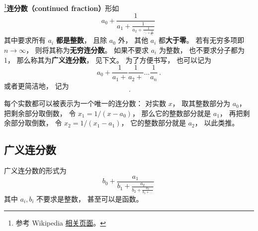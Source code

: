 
\footnote{参考 Wikipedia \href{https://en.wikipedia.org/wiki/Continued_fraction}{相关页面}。}\textbf{连分数（continued fraction）}形如
\begin{equation}
a_0 + \frac{1}{\displaystyle a_1 + \frac{1}{\displaystyle a_2 + \frac{1}{\displaystyle \ddots + \frac{1}{a_n}}}}~
\end{equation}
其中要求所有 $a_i$ \textbf{都是整数}， 且除 $a_0$ 外， 其他 $a_i$ 都\textbf{大于零}。 若有无穷多项即 $n\to\infty$， 则将其称为\textbf{无穷连分数}。 如果不要求 $a_i$ 为整数， 也不要求分子都为 1， 那么称其为\textbf{广义连分数}， 见下文。 为了方便书写， 也可以记为
\begin{equation}
a_0 + \frac{1}{a_1 + }\frac{1}{a_2 + }\dots \frac{1}{a_n}~.
\end{equation}
或者更简洁地， 记为
\begin{equation}
[a_0;\ a_1,\ a_2,\ \dots\ ,\ a_n]~.
\end{equation}

每个实数都可以被表示为一个唯一的连分数： 对实数 $x$， 取其整数部分为 $a_0$， 把剩余部分取倒数， 令 $x_1 = 1/(x-a_0)$， 那么它的整数部分就是 $a_1$， 再把剩余部分取倒数， 令 $x_2 = 1/(x_1 - a_1)$， 它的整数部分就是 $a_2$， 以此类推。

\subsection{广义连分数}
广义连分数的形式为
\begin{equation}
b_0 + \frac{a_1}{\displaystyle b_1 + \frac{a_2}{\displaystyle b_2 + \frac{a_3}{\displaystyle b_3 + \dots}}}~
\end{equation}
其中 $a_i, b_i$ 不要求是整数， 甚至可以是函数。
